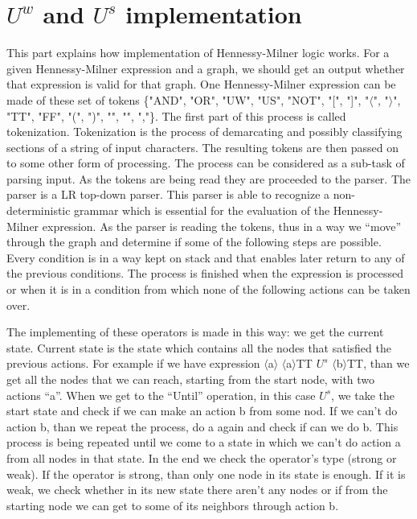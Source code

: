 \section{$U^w$ and $U^s$ implementation}

This part explains how implementation of Hennessy-Milner logic works. For a given Hennessy-Milner expression and a graph, we should get an output whether that expression is valid for that graph.  One Hennessy-Milner expression can be made of these set of tokens \{"AND", "OR", "UW", "US", "NOT", "[", "]", "$\langle$", "$\rangle$", "TT", "FF", "(", ")", "{", "}", ","\}.  The first part of this process is called tokenization. Tokenization is the process of demarcating and possibly classifying sections of a string of input characters. The resulting tokens are then passed on to some other form of processing.
The process can be considered as a sub-task of parsing input. As the tokens are being read they are proceeded to the parser. The parser is a LR top-down parser. This parser is able to recognize a non-deterministic grammar which is essential for the evaluation of the Hennessy-Milner expression. As the parser is reading the tokens, thus in a way we “move” through the graph and determine if some of the following steps are possible. Every condition is in a way kept on stack and that enables later return to any of the previous conditions. The process is finished when the expression  is processed or when it is in a condition from which none of the following actions can be taken over.

The implementing of these operators is made in this way: we get the current state. Current state is the state which contains all the nodes that satisfied the previous actions. For example if we have expression $\langle$a$\rangle$ $\langle$a$\rangle$TT $U^s$ $\langle$b$\rangle$TT, than we get all the nodes that we can reach, starting from the start node, with two actions “a”. When we get to the “Until” operation, in this case $U^s$, we take the start state and check if we can make an action b from some nod. If we can’t do action b, than we repeat the process, do a again and check if can we do b. This process is being repeated until we come to a state in which we can't do action a from all nodes in that state.
In the end we check the operator’s type (strong or weak). If the operator is strong, than only one node in its state is enough. If it is weak, we check whether in its new state there aren’t any nodes or if from the starting node we can get to some of its neighbors through action b. \\

